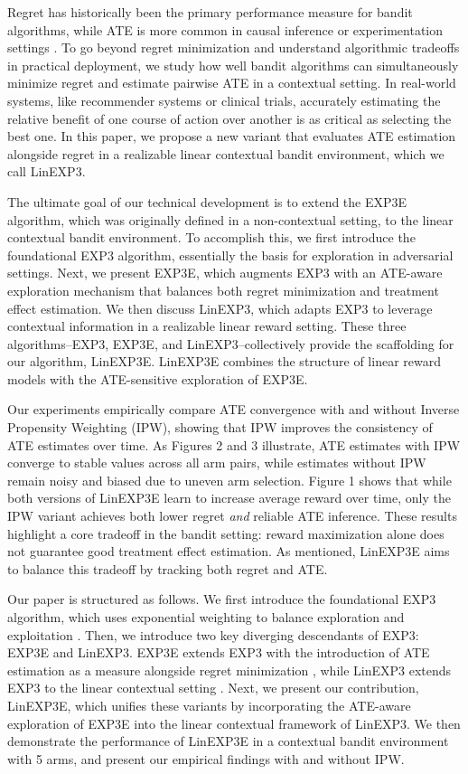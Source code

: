 Regret has historically been the primary performance measure for bandit algorithms, while ATE is more common in causal inference or experimentation settings \citep{lattimore2020bandit}. To go beyond regret minimization and understand algorithmic tradeoffs in practical deployment, we study how well bandit algorithms can simultaneously minimize regret and estimate pairwise ATE in a contextual setting. In real-world systems, like recommender systems or clinical trials, accurately estimating the relative benefit of one course of action over another is as critical as selecting the best one. In this paper, we propose a new variant that evaluates ATE estimation alongside regret in a realizable linear contextual bandit environment, which we call LinEXP3.

The ultimate goal of our technical development is to extend the EXP3E algorithm, which was originally defined in a non-contextual setting, to the linear contextual bandit environment. To accomplish this, we first introduce the foundational EXP3 algorithm, essentially the basis for exploration in adversarial settings. Next, we present EXP3E, which augments EXP3 with an ATE-aware exploration mechanism that balances both regret minimization and treatment effect estimation. We then discuss LinEXP3, which adapts EXP3 to leverage contextual information in a realizable linear reward setting. These three algorithms--EXP3, EXP3E, and LinEXP3--collectively provide the scaffolding for our algorithm, LinEXP3E. LinEXP3E combines the structure of linear reward models with the ATE-sensitive exploration of EXP3E.

Our experiments empirically compare ATE convergence with and without Inverse Propensity Weighting (IPW), showing that IPW improves the consistency of ATE estimates over time. As Figures 2 and 3 illustrate, ATE estimates with IPW converge to stable values across all arm pairs, while estimates without IPW remain noisy and biased due to uneven arm selection. Figure 1 shows that while both versions of LinEXP3E learn to increase average reward over time, only the IPW variant achieves both lower regret \textit{and} reliable ATE inference. These results highlight a core tradeoff in the bandit setting: reward maximization alone does not guarantee good treatment effect estimation. As mentioned, LinEXP3E aims to balance this tradeoff by tracking both regret and ATE.

Our paper is structured as follows. We first introduce the foundational EXP3 algorithm, which uses exponential weighting to balance exploration and exploitation \citep{auer2002exp3}. Then, we introduce two key diverging descendants of EXP3: EXP3E and LinEXP3. EXP3E extends EXP3 with the introduction of ATE estimation as a measure alongside regret minimization \citep{simchilevi2023adaptive}, while LinEXP3 extends EXP3 to the linear contextual setting \citep{neu2020linear}. Next, we present our contribution, LinEXP3E, which unifies these variants by incorporating the ATE-aware exploration of EXP3E into the linear contextual framework of LinEXP3. We then demonstrate the performance of LinEXP3E in a contextual bandit environment with 5 arms, and present our empirical findings with and without IPW.

